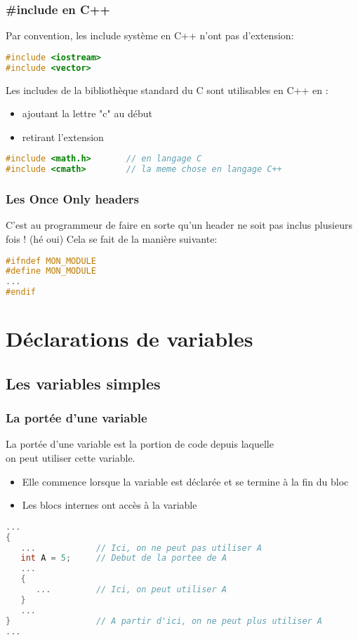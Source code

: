\documentclass{beamer}
\begin{document}
\begin{frame}[fragile=singleslide,shrink=20]
\frametitle {\#include en C++}
Par convention, les include système en C++ n'ont pas d'extension:

\begin{lstlisting}[language=c++]
#include <iostream>
#include <vector>
\end{lstlisting}

Les includes de la bibliothèque standard du C sont utilisables en C++ en :
\begin{itemize}
\item{ajoutant la lettre "c" au début}
\item{retirant l'extension}
\end{itemize}

\begin{lstlisting}[language=c++]
#include <math.h>       // en langage C
#include <cmath>        // la meme chose en langage C++
\end{lstlisting}
\end{frame}

\begin{frame}[fragile=singleslide,shrink=20]
\frametitle {Les Once Only headers}
C'est au programmeur de faire en sorte qu'un header ne soit pas inclus plusieurs fois ! (hé oui)
Cela se fait de la manière suivante:

\begin{lstlisting}[language=c++]
#ifndef MON_MODULE
#define MON_MODULE
...
#endif
\end{lstlisting}
\end{frame}

\section{Déclarations de variables}

\subsection{Les variables simples}

\begin{frame}[fragile=singleslide,shrink=20]
\frametitle {La portée d'une variable}
La portée d'une variable est la portion de code depuis laquelle \\
on peut utiliser cette variable. \\
\begin{itemize}
\item{Elle commence lorsque la variable est déclarée et se termine à la fin du bloc}
\item{Les blocs internes ont accès à la variable}
\end{itemize}

\begin{lstlisting}[language=c++]
...
{
   ...            // Ici, on ne peut pas utiliser A
   int A = 5;     // Debut de la portee de A
   ...
   {
      ...         // Ici, on peut utiliser A
   }
   ...
}                 // A partir d'ici, on ne peut plus utiliser A 
...
\end{lstlisting}
\end{frame}
\end{document}
